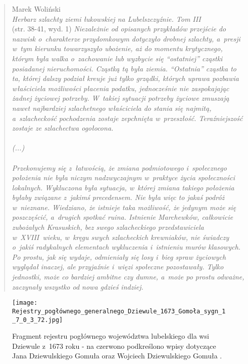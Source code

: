 \begin{quote}{Marek Woliński \\ \null\hfill \emph{Herbarz szlachty ziemi 
    łukowskiej na Lubelszczyźnie. Tom III} \\ \null\hfill (str. 38-41, 
    wyd. 1)}
\textit{Niezależnie od opisanych przykładów przejście do nazwisk 
o~charakterze przydomkowym dotyczyło drobnej szlachty, a~presji w~tym 
kierunku towarzyszyło ubożenie, aż do momentu krytycznego, którym była walka 
o~zachowanie lub wyzbycie się \enquote{ostatniej} cząstki posiadanej 
nieruchomości. Cząstką tą była ziemia. \enquote{Ostatnia} cząstka to ta, 
której dalszy podział kreuje już tylko grządki, których uprawa pozbawia 
właściciela możliwości płacenia podatku, jednocześnie nie zaspokajając 
żadnej życiowej potrzeby. W~takiej sytuacji potrzeby życiowe zmuszają nawet 
najbardziej szlachetnego właściciela do stania się najmitą, a~szlacheckość 
pochodzenia zostaje zepchnięta w~przeszłość. Teraźniejszość zostaje ze 
szlachectwa ogołocona.
\\
\\
(...)
\\
\\
Przekonujemy się z~łatwością, że zmiana podmiotowego i~społecznego położenia 
nie była niczym nadzwyczajnym w~praktyce życia społeczności lokalnych. 
Wykluczona była sytuacja, w~której zmiana takiego położenia byłaby związane 
z~jakimś precedensem. Nie była więc to jakaś podróż w~nieznane. Wiedziano, 
że istnieje taka możliwość, że jedynym może się poszczęścić, a~drugich 
spotkać ruina. Istnienie Marchewków, całkowicie zubożałych Krasuskich, bez 
swego szlacheckiego przedstawiciela w~XVIII~wieku, w~kręgu swych szlacheckich 
krewniaków, nie świadczy o~jakiś radykalnych elementach wykluczenia 
i~istnieniu murów klasowych. Po prostu, jak się wydaje, odmieniały się losy 
i~bieg spraw życiowych wyglądał inaczej, ale przyjaźnie i~więzi społeczne 
pozostawały. Tylko jednostki, może co bardziej ambitne czy dumne, a~może po 
prostu odważne, zaczynały wszystko od nowa gdzieś indziej.}
\end{quote}

\begin{figure}[!ht]
    \vspace*{0.5cm}
    \centering \texttt{[image: 
        Rejestry\_pogłównego\_generalnego\_Dziewule\_1673\_Gomoła\_sygn\_1\_7\_0\_3\_72.jpg]}
    \captionsetup{format=hang}
    \caption{Fragment rejestru pogłównego województwa lubelskiego dla wsi 
    Dziewule z~1673 roku - na czerwono podkreślono wpisy dotyczące Jana 
    Dziewulskiego Gomuła oraz Wojciech Dziewulskiego Gomuła \cite{agad1}.}
    \label{fig:dziewule_1673}
\end{figure}

